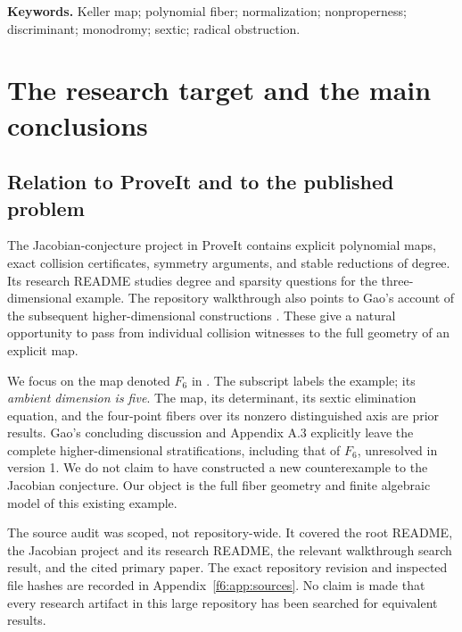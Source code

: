 \documentclass[11pt,a4paper]{article}
\theoremstyle{definition}
\begin{document}
\medskip
\noindent\textbf{Keywords.} Keller map; polynomial fiber; normalization;
nonproperness; discriminant; monodromy; sextic; radical obstruction.

\newpage
\begingroup
\small
\setlength{\parskip}{0pt}
\tableofcontents
\endgroup
\newpage

\section{The research target and the main conclusions}
\label{f6:sec:intro}

\subsection{Relation to ProveIt and to the published problem}
The Jacobian-conjecture project in ProveIt contains explicit polynomial
maps, exact collision certificates, symmetry arguments, and stable
reductions of degree. Its research README studies degree and sparsity
questions for the three-dimensional example. The repository walkthrough
also points to Gao's account of the subsequent higher-dimensional
constructions \cite{ProveIt,Gao}. These give a natural opportunity to pass
from individual collision witnesses to the full geometry of an explicit
map.

We focus on the map denoted $F_6$ in \cite[\S4.5.1, Theorem 4.5]{Gao}.
The subscript labels the example; its \emph{ambient dimension is five}.
The map, its determinant, its sextic elimination equation, and the
four-point fibers over its nonzero distinguished axis are prior results.
Gao's concluding discussion and Appendix A.3 explicitly leave the
complete higher-dimensional stratifications, including that of $F_6$,
unresolved in version 1. We do not claim to have constructed a new
counterexample to the Jacobian conjecture. Our object is the full fiber
geometry and finite algebraic model of this existing example.

The source audit was scoped, not repository-wide. It covered the root
README, the Jacobian project and its research README, the relevant
walkthrough search result, and the cited primary paper. The exact
repository revision and inspected file hashes are recorded in
Appendix~\ref{f6:app:sources}. No claim is made that every research artifact
in this large repository has been searched for equivalent results.
\end{document}
